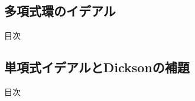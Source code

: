 \documentclass[aspectratio=169, dvipdfmx, 11pt]{beamer} %
\begin{document}
%

\subsection{多項式環のイデアル}
\begin{frame}{目次}
	\tableofcontents[currentsubsection]
\end{frame}



\subsection{単項式イデアルとDicksonの補題}
\begin{frame}{目次}
	\tableofcontents[currentsubsection]
\end{frame}


\end{document}
